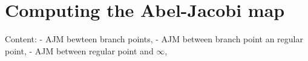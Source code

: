 \documentclass[main.tex]{subfiles}
\begin{document}
  \section{Computing the Abel-Jacobi map}

  Content: - AJM bewteen branch points, 
	   - AJM between branch point an regular point,
	   - AJM between regular point and $\infty$,
  
\end{document}
